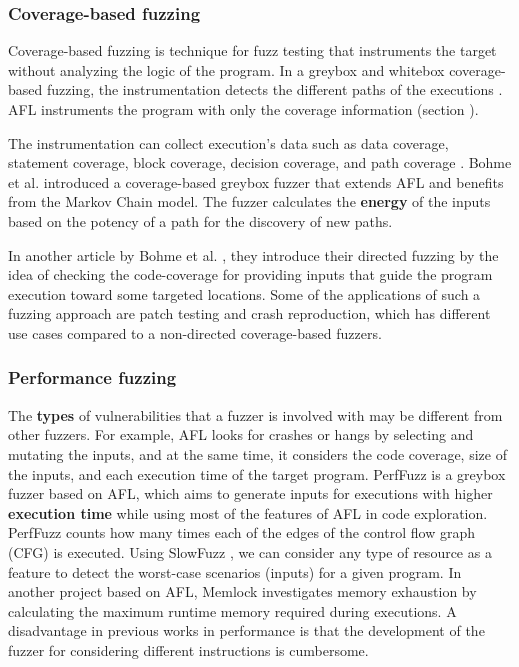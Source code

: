 \subsubsection*{Coverage-based fuzzing}

Coverage-based fuzzing is technique for fuzz testing that instruments the target without analyzing the logic of the program. In a greybox and whitebox coverage-based fuzzing, the instrumentation detects the different paths of the executions \cite{liang2018fuzzing}. AFL instruments the program with only the coverage information (section ).

The instrumentation can collect execution's data such as data coverage, statement coverage, block coverage, decision coverage, and path coverage \cite{yang2009survey}. Bohme et al. \cite{bohme2017coverage} introduced a coverage-based greybox fuzzer that extends AFL and benefits from the Markov Chain model. The fuzzer calculates the \textbf{energy} of the inputs based on the potency of a path for the discovery of new paths.

In another article by Bohme et al. \cite{bohme2017directed}, they introduce their directed fuzzing by the idea of checking the code-coverage for providing inputs that guide the program execution toward some targeted locations. Some of the applications of such a fuzzing approach are patch testing and crash reproduction, which has different use cases compared to a non-directed coverage-based fuzzers.

\subsubsection*{Performance fuzzing}

The \textbf{types} of vulnerabilities that a fuzzer is involved with may be different from other fuzzers. For example, AFL looks for crashes or hangs by selecting and mutating the inputs, and at the same time, it considers the code coverage, size of the inputs, and each execution time of the target program. PerfFuzz \cite{lemieux2018perffuzz} is a greybox fuzzer based on AFL, which aims to generate inputs for executions with higher \textbf{execution time} while using most of the features of AFL in code exploration. PerfFuzz counts how many times each of the edges of the control flow graph (CFG) is executed. Using SlowFuzz \cite{petsios2017slowfuzz}, we can consider any type of resource as a feature to detect the worst-case scenarios (inputs) for a given program. In another project based on AFL, Memlock \cite{wen2020memlock} investigates memory exhaustion by calculating the maximum runtime memory required during executions. A disadvantage in previous works in performance is that the development of the fuzzer for considering different instructions is cumbersome.

